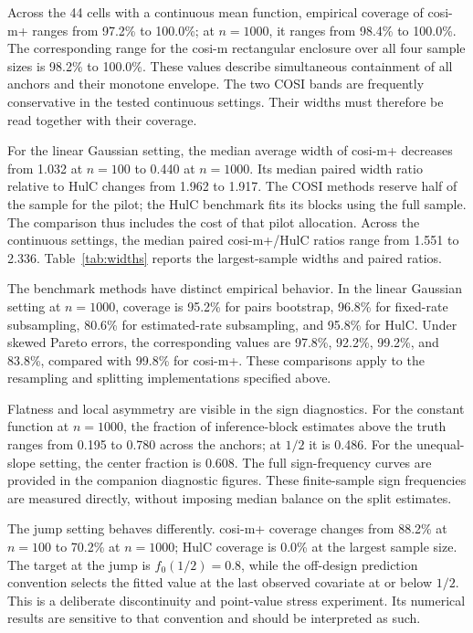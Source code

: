 \documentclass[10pt]{article}
\begin{document}
Across the 44 cells with a continuous mean function, empirical coverage of
cosi-m+ ranges from 97.2\% to 100.0\%; at $n=1000$, it ranges from 98.4\%
to 100.0\%. The corresponding range for the cosi-m rectangular enclosure
over all four sample sizes is 98.2\% to 100.0\%. These values describe
simultaneous containment of all anchors and their monotone envelope.
The two COSI bands are frequently conservative in the tested continuous settings.
Their widths must therefore be read together with their coverage.

For the linear Gaussian setting, the median average width of cosi-m+ decreases
from 1.032 at $n=100$ to 0.440 at $n=1000$.
Its median paired width ratio relative to HulC changes from 1.962
to 1.917. The COSI methods reserve half of the sample for the pilot;
the HulC benchmark fits its blocks using the full sample. The comparison thus
includes the cost of that pilot allocation. Across the continuous settings,
the median paired cosi-m+/HulC ratios range from 1.551 to 2.336.
Table~\ref{tab:widths} reports the largest-sample widths and paired ratios.

The benchmark methods have distinct empirical behavior. In the linear Gaussian
setting at $n=1000$, coverage is 95.2\% for pairs bootstrap,
96.8\% for fixed-rate subsampling, 80.6\% for estimated-rate
subsampling, and 95.8\% for HulC. Under skewed Pareto errors, the
corresponding values are 97.8\%, 92.2\%, 99.2\%, and
83.8\%, compared with 99.8\% for cosi-m+.
These comparisons apply to the resampling and splitting implementations specified above.

Flatness and local asymmetry are visible in the sign diagnostics.
For the constant function at $n=1000$, the fraction of inference-block estimates
above the truth ranges from 0.195 to 0.780 across the anchors;
at $1/2$ it is 0.486. For the unequal-slope setting, the center fraction
is 0.608. The full sign-frequency curves are provided in the companion diagnostic figures.
These finite-sample sign frequencies are measured directly, without imposing
median balance on the split estimates.

The jump setting behaves differently. cosi-m+ coverage changes from 88.2\%
at $n=100$ to 70.2\% at $n=1000$; HulC coverage is 0.0\% at the
largest sample size. The target at the jump is $f_0(1/2)=0.8$, while the
off-design prediction convention selects the fitted value at the last observed
covariate at or below $1/2$. This is a deliberate discontinuity and point-value
stress experiment. Its numerical results are sensitive to that convention and
should be interpreted as such.
\end{document}
